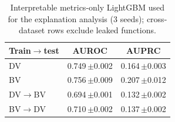\begin{table}[t]
\centering\footnotesize
\caption{Interpretable metrics-only LightGBM used for the explanation analysis (3 seeds); cross-dataset rows exclude leaked functions.}\label{tab:explain}
\begin{tabular}{lcc}
\toprule
Train$\to$test & AUROC & AUPRC \\
\midrule
DV & 0.749\,{\scriptsize$\pm$0.002} & 0.164\,{\scriptsize$\pm$0.003} \\
BV & 0.756\,{\scriptsize$\pm$0.009} & 0.207\,{\scriptsize$\pm$0.012} \\
DV$\to$BV & 0.694\,{\scriptsize$\pm$0.001} & 0.132\,{\scriptsize$\pm$0.002} \\
BV$\to$DV & 0.710\,{\scriptsize$\pm$0.002} & 0.137\,{\scriptsize$\pm$0.002} \\
\bottomrule
\end{tabular}
\end{table}
